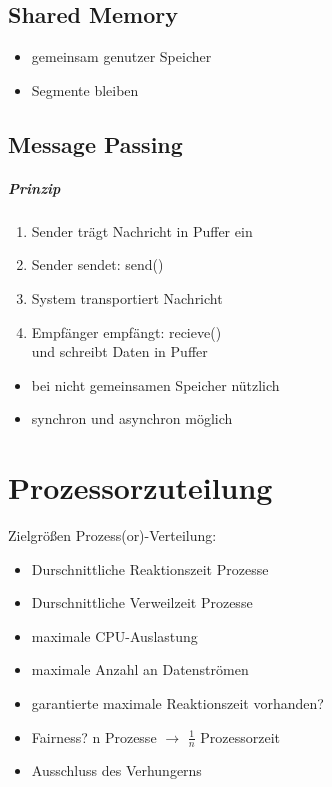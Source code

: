 \section{Shared Memory}
\begin{itemize}
\item gemeinsam genutzer Speicher
\item Segmente bleiben 
\end{itemize}

\section{Message Passing}
\paragraph{Prinzip}
\begin{enumerate}
\item Sender trägt Nachricht in Puffer ein
\item Sender sendet: send()
\item System transportiert Nachricht
\item Empfänger empfängt: recieve()\\
und schreibt Daten in Puffer
\end{enumerate}
\begin{itemize}
\item bei nicht gemeinsamen Speicher nützlich
\item synchron und asynchron möglich
\end{itemize}

\chapter{Prozessorzuteilung}
Zielgrößen Prozess(or)-Verteilung:
\begin{itemize}
\item Durschnittliche Reaktionszeit Prozesse
\item Durschnittliche Verweilzeit Prozesse
\item maximale CPU-Auslastung
\item maximale Anzahl an Datenströmen
\item garantierte maximale Reaktionszeit vorhanden?
\item Fairness? n Prozesse $\to$ $\tfrac{1}{n}$ Prozessorzeit
\item Ausschluss des Verhungerns
\end{itemize}

